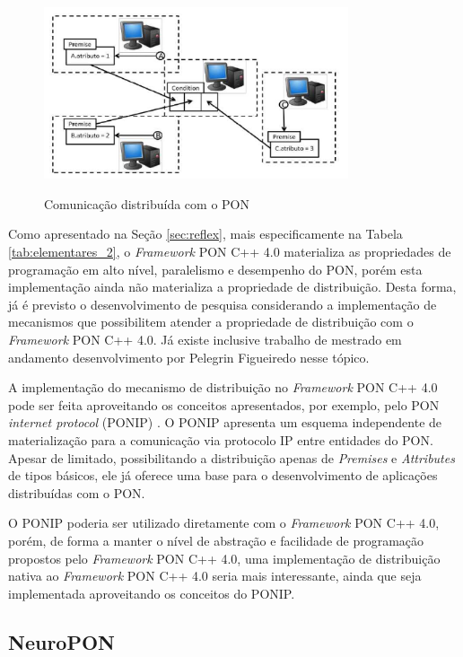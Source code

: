 \begin{figure}[!htb]
\centering
\caption{Comunicação distribuída com o PON}
\includegraphics[width=0.8\textwidth]{../figures/pon_dist.PNG}
\smallskip
{}
\label{fig:pon_dist}
\end{figure}

Como apresentado na Seção \ref{sec:reflex}, mais especificamente na Tabela
\ref{tab:elementares_2}, o \textit{Framework} PON C++ 4.0 materializa as
propriedades de programação em alto nível, paralelismo e desempenho do PON,
porém esta implementação ainda não materializa a propriedade de distribuição.
Desta forma, já é previsto o desenvolvimento de pesquisa considerando a
implementação de mecanismos que possibilitem atender a propriedade de
distribuição com o \textit{Framework} PON C++ 4.0. Já existe inclusive trabalho
de mestrado em andamento desenvolvimento por Pelegrin Figueiredo nesse
tópico.

A implementação do mecanismo de distribuição no \textit{Framework} PON C++ 4.0
pode ser feita aproveitando os conceitos apresentados, por exemplo, pelo PON
\textit{internet protocol} (PONIP) \cite{talau_2016}. O PONIP apresenta um
esquema independente de materialização para a comunicação via protocolo IP entre
entidades do PON. Apesar de limitado, possibilitando a distribuição apenas de
\textit{Premises} e \textit{Attributes} de tipos básicos, ele já oferece uma
base para o desenvolvimento de aplicações distribuídas com o PON.

O PONIP poderia ser utilizado diretamente com o \textit{Framework} PON C++ 4.0,
porém, de forma a manter o nível de abstração e facilidade de programação
propostos pelo \textit{Framework} PON C++ 4.0, uma implementação de distribuição
nativa ao \textit{Framework} PON C++ 4.0 seria mais interessante, ainda que seja
implementada aproveitando os conceitos do PONIP.

\subsection{NeuroPON}\label{sec:neuropon_futuro}

